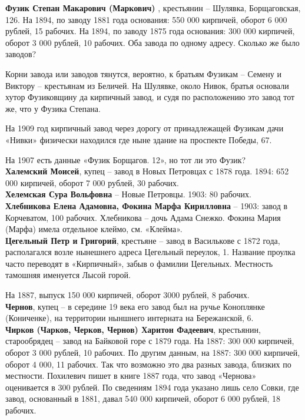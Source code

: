 \noindent\textbf{Фузик Степан Макарович (Маркович)} , крестьянин – Шулявка, Борщаговская, 126. На 1894, по заводу 1881 года основания: 550 000 кирпичей, оборот 6 000 рублей, 15 рабочих. На 1894, по заводу 1875 года основания: 300 000 кирпичей, оборот 3 000 рублей, 10 рабочих. Оба завода по одному адресу. Сколько же было заводов?

Корни завода или заводов тянутся, вероятно, к братьям Фузикам – Семену и Виктору – крестьянам из Беличей. На Шулявке, около Нивок, братья основали хутор Фузиковщину да кирпичный завод, и судя по расположению это завод тот же, что у Фузика Степана.

На 1909 год кирпичный завод через дорогу от принадлежащей Фузикам дачи «Нивки» физически находился где ныне здание на проспекте Победы, 67.

На 1907 есть данные «Фузик Борщагов. 12», но тот ли это Фузик?\\

\noindent\textbf{Халемский Моисей}, купец – завод в Новых Петровцах с 1878 года. 1894: 652 000 кирпичей, оборот 7 000 рублей, 30 рабочих.\\

\noindent\textbf{Хелемская Сура Вольфовна} – Новые Петровцы. 1903: 80 рабочих.\\

\noindent\textbf{Хлебникова Елена Адамовна, Фокина Марфа Кирилловна} – 1903: завод в Корчеватом, 100 рабочих. Хлебникова – дочь Адама Снежко. Фокина Мария (Марфа) имела отдельное клеймо, см. «Клейма».\\

\noindent\textbf{Цегельный Петр и Григорий}, крестьяне – завод в Василькове с 1872 года, располагался возле нынешнего адреса Цегельный переулок, 1. Название проулка часто переводят в «Кирпичный», забыв о фамилии Цегельных. Местность тамошняя именуется Лысой горой.

На 1887, выпуск 150 000 кирпичей, оборот 3000 рублей, 8 рабочих.\\

\noindent\textbf{Чернов}, купец – в середине 19 века его завод был на ручье Коноплянке (Кониченке), на территории ныншнего интерната на Бережанской, 6.\\

\noindent\textbf{Чирков (Чарков, Черков, Чернов) Харитон Фадеевич}, крестьянин, старообрядец – завод на Байковой горе с 1879 года. На 1887: 300 000 кирпичей, оборот 3 000 рублей, 10 рабочих. По другим данным, на 1887: 300 000 кирпичей, оборот 4 000, 11 рабочих. Так что возможно это два разных завода, близких по местности. Похилевич пишет в книге 1887 года, что завод «Чернова» оценивается в 300 рублей. По сведениям 1894 года указано лишь село Совки, где завод, основанный в 1881, давал 540 000 кирпичей, оборот 6 000 рублей, 18 рабочих.

